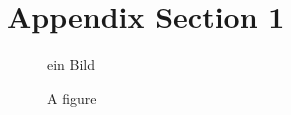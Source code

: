 

\appendix



\section{Appendix Section 1}
\label{appendix1}

\begin{figure} [ht]
  \centering
   ein Bild
  \caption{A figure}
  \label{fig:BPMNBeispiela}
\end{figure}
